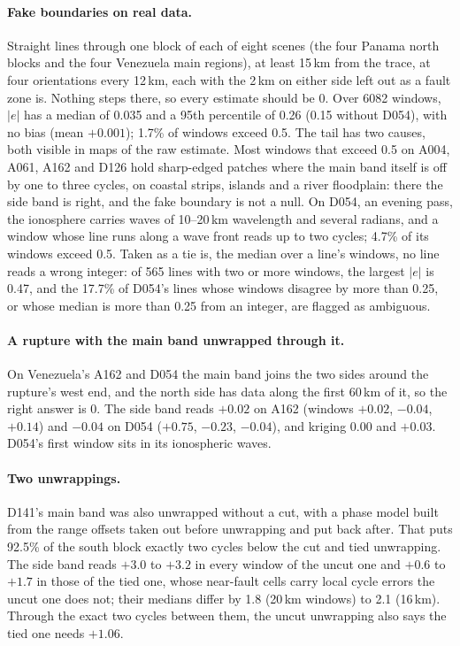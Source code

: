 \paragraph{Fake boundaries on real data.} Straight lines through one block of each of eight scenes (the four Panama
north blocks and the four Venezuela main regions), at least 15\,km from the trace, at four orientations every 12\,km,
each with the 2\,km on either side left out as a fault zone is. Nothing steps there, so every estimate should be 0.
Over 6082 windows, $|e|$ has a median of 0.035 and a 95th percentile of 0.26 (0.15 without D054), with no bias (mean
$+0.001$); 1.7\% of windows exceed 0.5. The tail has two causes, both visible in maps of the raw estimate. Most windows
that exceed 0.5 on A004, A061, A162 and D126 hold sharp-edged patches where the main band itself is off by one to
three cycles, on coastal strips, islands and a river floodplain: there the side band is right, and the fake boundary
is not a null. On D054, an evening pass, the ionosphere carries waves of 10--20\,km wavelength and several radians,
and a window whose line runs along a wave front reads up to two cycles; 4.7\% of its windows exceed 0.5. Taken as a tie is, the median over a
line's windows, no line reads a wrong integer: of 565 lines with two or more windows, the largest $|e|$ is 0.47, and
the 17.7\% of D054's lines whose windows disagree by more than 0.25, or whose median is more than 0.25 from an
integer, are flagged as ambiguous.

\paragraph{A rupture with the main band unwrapped through it.} On Venezuela's A162 and D054 the main band joins the
two sides around the rupture's west end, and the north side has data along the first 60\,km of it, so the right answer
is 0. The side band reads $+0.02$ on A162 (windows $+0.02$, $-0.04$, $+0.14$) and $-0.04$ on D054 ($+0.75$, $-0.23$,
$-0.04$), and kriging $0.00$ and $+0.03$. D054's first window sits in its ionospheric waves.

\paragraph{Two unwrappings.} D141's main band was also unwrapped without a cut, with a phase model built from the
range offsets taken out before unwrapping and put back after. That puts 92.5\% of the south block exactly two cycles
below the cut and tied unwrapping. The side band reads $+3.0$ to $+3.2$ in every window of the uncut one and $+0.6$ to
$+1.7$ in those of the tied one, whose near-fault cells carry local cycle errors the uncut one does not; their medians
differ by 1.8 (20\,km windows) to 2.1 (16\,km). Through the exact two cycles between them, the uncut unwrapping also
says the tied one needs $+1.06$.

